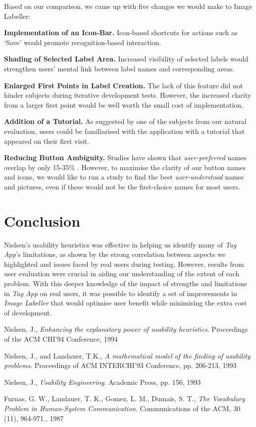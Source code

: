 \documentclass[11pt,twocolumn]{article}
\begin{document}
Based on our comparison, we came up with five changes we would make to Image
Labeller:

\textbf{Implementation of an Icon-Bar.} Icon-based shortcuts for actions such as `Save' would promote recognition-based interaction.

 \textbf{Shading of Selected Label Area.} Increased visibility of selected labels would strengthen users' mental link between label names and corresponding areas.

\textbf{Enlarged First Points in Label Creation.} The lack of this feature did not hinder subjects during iterative development tests. However, the increased clarity from a larger first point would be well worth the small cost of implementation.

\textbf{Addition of a Tutorial.} As suggested by one of the subjects from our natural evaluation, users could be familiarised with the application with a tutorial that appeared on their first visit.

\textbf{Reducing Button Ambiguity.} Studies have shown that \emph{user-preferred} names overlap by only 15-35\% \cite{furnas1987}. However, to maximise the clarity of our button names and icons, we would like to run a study to find the best \emph{user-understood} names and pictures, even if these would not be the first-choice names for most users.  

\section{Conclusion}

Nielsen's usability heuristics was effective in helping us identify many of \emph{Tag App}'s limitations, as shown by the strong correlation between aspects we highlighted and issues faced by real users during testing. However, results from user evaluation were crucial in aiding our understanding of the extent of each problem. With this deeper knowledge of the impact of strengths and limitations in \emph{Tag App} on real users, it was possible to identify a set of improvements in \emph{Image Labeller} that would optimise user benefit while minimising the extra cost of development.

\newpage
\begin{thebibliography}{9}

  Nielsen, J.,
  \emph{Enhancing the explanatory power of usability heuristics}.
  Proceedings of the ACM CHI'94 Conference,
  1994

  Nielsen, J., and Landauer, T.K.,
  \emph{A mathematical model of the finding of usability problems}.
  Proceedings of ACM INTERCHI'93 Conference, pp. 206-213,
  1993

  Nielsen, J.,
  \emph{Usability Engineering}.
  Academic Press, pp. 156,
  1993

 Furnas, G. W., Landauer, T. K., Gomez, L. M., Dumais, S. T.,
 \emph{The Vocabulary Problem in Human-System Communication}. 
  Communications of the ACM, 30 (11), 964-971.,
  1987

\end{thebibliography}
\end{document}
